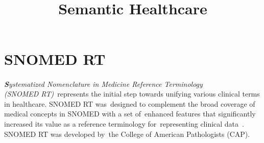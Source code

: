 \documentclass[DIV=calc, paper=a4, fontsize=12pt, onecolumn]{scrartcl}	 %
\title{Semantic Healthcare} %
\author{\authoring} %
\date{} %
\newcommand{\initial}[1]{ %
\lettrine[lines=3,lhang=0.3,nindent=0em,slope=0em]{
\color{DarkBlue}
{\textbf{\textit{#1}}}}{}}
\begin{document}
  \maketitle
  \renewcommand{\contentsname}{\hspace{120pt} Table of Contents}
  \tableofcontents
  \thispagestyle{fancy} %
  \vspace{20pt}
   \section[Systematized Nomenclature in Medicine  Reference Terminology (SNOMED RT\textsuperscript{\textregistered})]
   {SNOMED RT\textsuperscript{\textregistered}}
   \label{sec:snomedrt}
   
   \initial{S}\textit{ystematized Nomenclature in Medicine Reference Terminology\\ (SNOMED RT)}\
   represents the initial step towards unifying various clinical terms in healthcare. SNOMED RT was\
   designed to complement the broad coverage of medical concepts in SNOMED with a set of\
   enhanced features that significantly increased its value as a reference terminology for\
   representing clinical data~\cite{spackman_snomed_1997}. SNOMED RT was developed by\
   the College of American Pathologists (CAP).\\
   
\end{document}

